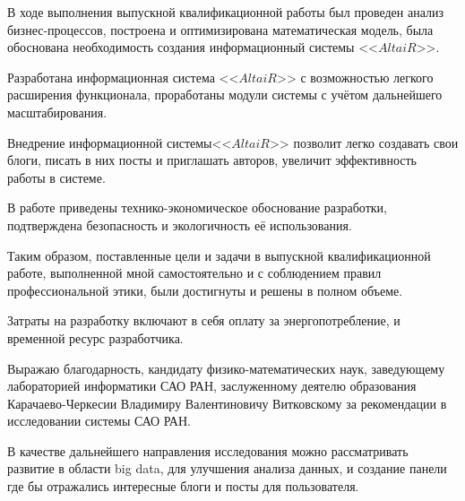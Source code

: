 В ходе выполнения выпускной квалификационной работы был проведен анализ бизнес-процессов, построена и оптимизирована математическая модель, была обоснована необходимость создания информационный системы <<$AltaiR$>>.

Разработана информационная система <<$AltaiR$>> с возможностью легкого расширения функционала, проработаны модули системы с
учётом дальнейшего масштабирования.

Внедрение информационной системы<<$AltaiR$>> позволит легко создавать свои блоги, писать в них посты и приглашать авторов, увеличит эффективность работы в системе.

В работе приведены технико-экономическое обоснование разработки, подтверждена безопасность и экологичность её использования.

Таким образом, поставленные цели и задачи в выпускной квалификационной работе, выполненной мной самостоятельно и с соблюдением правил профессиональной этики, были достигнуты и решены в полном объеме.

Затраты на разработку включают в себя оплату за энергопотребление, и временной ресурс разработчика.   

Выражаю благодарность, кандидату физико-математических наук, заведующему лабораторией информатики САО РАН, заслуженному деятелю образования Карачаево-Черкесии Владимиру Валентиновичу Витковскому за рекомендации в исследовании системы САО РАН.   

В качестве дальнейшего направления исследования можно рассматривать развитие в области big data, для улучшения анализа данных, и создание панели где бы отражались интересные блоги и посты для пользователя. 

\pagebreak